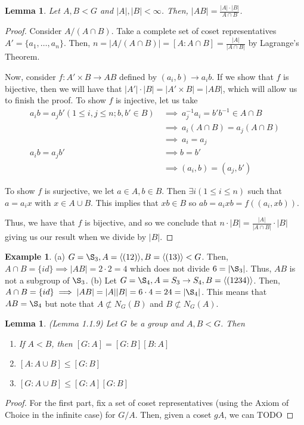 \documentclass[11pt,leqno,oneside]{amsart}
\newcommand{\subgroup}{\mathrel{<}}
\newtheorem{lem}[thm]{Lemma}
\theoremstyle{definition}
\newtheorem{example}[thm]{Example}
\numberwithin{equation}{section}
\begin{document}
    \begin{lem}
        Let $A,B \subgroup G$ and $|A|, |B| < \infty$. Then, $|AB| = \frac{|A| \cdot |B|}{A \cap B}$.
    \end{lem}
    \begin{proof}
        Consider $A/(A \cap B)$. Take a complete set of coset representatives $A' = \{a_1, \ldots, a_n\}$. Then, $n = |A/(A \cap B)| = [A : A \cap B] = \frac{|A|}{|A \cap B|}$ by Lagrange's Theorem.

        Now, consider $f: A' \times B \to AB$ defined by $(a_i,b) \to a_ib$. If
        we show that $f$ is bijective, then we will have that $|A'| \cdot |B| =
        |A' \times B| = |AB|$, which will allow us to finish the proof.
        To show $f$ is injective, let us take \begin{align*}
            a_ib = a_jb' (1 \leq i,j \leq n; b,b' \in B) & \ \implies \ a_j^{-1} a_i = b'b^{-1} \in A\cap B\\
            \ & \ \implies \ a_i(A \cap B) = a_j(A \cap B) \\
            \ & \ \implies \ a_i = a_j \\
            a_ib = a_jb' & \ \implies b = b' \\
            \ & \ \implies (a_i, b) = (a_j, b')
        \end{align*}

        To show $f$ is surjective, we let $a \in A, b \in B$. Then $\exists i
        (1 \leq i \leq n)$ such that $a=a_ix$ with $x \in A \cup B$. This
        implies that $xb \in B$ so $ab = a_ixb = f( (a_i,xb) )$.

        Thus, we have that $f$ is bijective, and so we conclude that $n \cdot
        |B| = \frac{|A|}{|A \cap B|} \cdot |B|$ giving us our result when we
        divide by $|B|$.
    \end{proof}
    \begin{example}
        (a) $G = \S_3, A = \langle (12) \rangle, B = \langle (13) \rangle
        \subgroup G$. Then, $A \cap B = \{ id \} \implies |AB| = 2 \cdot 2 = 4$
        which does not divide $6 = |\S_3|$. Thus, $AB$ is not a subgroup of
        $\S_3$. 
        (b) Let $G=\S_4, A = S_3 \to S_4, B = \langle (1234) \rangle$. Then, $A \cap B = \{id\} \implies |AB| = |A||B| = 6 \cdot 4 = 24 = |\S_4|$. This means that $AB = \S_4$ but note that $A \not\subset N_G(B)$ and $B \not\subset N_G(A)$. 
    \end{example}
    \begin{lem}
        (Lemma 1.1.9) Let $G$ be a group and $A,B \subgroup G$. Then
        \begin{enumerate}[label=\Alph*]
            \item If $A \subgroup B$, then $[G:A] = [G:B][B:A]$
            \item $[A: A \cup B] \leq [G:B]$
            \item $[G: A \cup B] \leq [G:A][G:B]$
        \end{enumerate}
    \end{lem}
    \begin{proof}
       For the first part, fix a set of coset representatives (using the Axiom of Choice in the infinite case) for $G/A$. Then, given a coset $gA$, we can TODO 
\end{proof}
\end{document}
